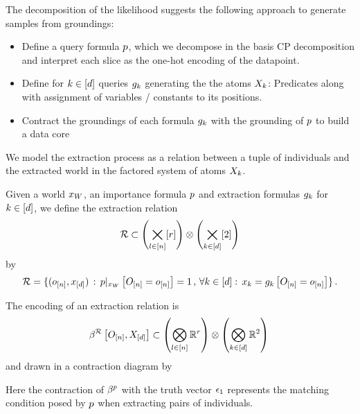 
The decomposition of the likelihood suggests the following approach to generate samples from groundings:
\begin{itemize}
    \item Define a query formula $p$, which we decompose in the basis CP decomposition and interpret each slice as the one-hot encoding of the datapoint.
    \item Define for $k\in[d]$ queries $g_{k}$ generating the the atoms $X_{k}$:
    Predicates along with assignment of variables / constants to its positions.
    \item Contract the groundings of each formula $g_{k}$ with the grounding of $p$ to build a data core
\end{itemize}



We model the extraction process as a relation between a tuple of individuals and the extracted world in the factored system of atoms $X_{k}$.

\begin{definition}
    \label{def:extractionRelation}
    Given a \firstOrderLogic{} world $x_{W}$, an importance formula $p$ and extraction formulas $g_{k}$ for $k\in[d]$, we define the extraction relation
    \begin{align*}
        \mathcal{R} \subset \left(\bigtimes_{l\in[n]}[r]\right) \otimes \left(\bigtimes_{k\in[d]}[2]\right)
    \end{align*}
    by
    \begin{align*}
        \mathcal{R}
        = \{ (o_{[n]}, x_{[d]})
        \, : \,  {p}|_{x_{W}} \left[O_{[n]}=o_{[n]}\right] = 1 \, , \, \forall {k\in[d]} : \,  x_{k} = g_{k}\left[O_{[n]}=o_{[n]}\right] \} \, .
    \end{align*}
\end{definition}

The encoding of an extraction relation is
\begin{align*}
    \beta^{\mathcal{R}}\left[O_{[n]},X_{[d]}\right] \subset \left(\bigotimes_{l\in[n]}\mathbb{R}^{r}\right) \otimes \left(\bigotimes_{k\in[d]}\mathbb{R}^2\right) \,
\end{align*}
and drawn in a contraction diagram by
\begin{center}
    
\end{center}
Here the contraction of $\beta^{p}$ with the truth vector $\epsilon_1$ represents the matching condition posed by $p$ when extracting pairs of individuals.


